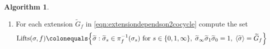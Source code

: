 \documentclass{dcthesis}
\newcommand{\ZZ}{\mathbb Z}
\newcommand{\wt}[1]{\widetilde{#1}}
\DeclareMathOperator{\Lifts}{Lifts}
\DeclareMathOperator{\order}{order}
\numberwithin{equation}{section}
\theoremstyle{definition}
\newtheorem{alg}[equation]{Algorithm}
\theoremstyle{remark}
\begin{document}
{{{\begin{alg}
\begin{enumerate}
\begin{equation}
          \end{equation}
        \item
          \label{alg:triplescomputelifts}
          For each extension
          $\wt{G}_f$ in
          \eqref{eqn:extensiondependson2cocycle}
          compute the set
          \begin{equation}
            \label{eqn:lifts}
            \Lifts(\sigma, f)
            \colonequals
            \Big\{
              \wt{\sigma}
              :
              \wt{\sigma}_s\in\pi_f^{-1}
              (\sigma_s)\text{ for }
              s\in\{0,1,\infty\},\;
              \wt{\sigma}_\infty
              \wt{\sigma}_1
              \wt{\sigma}_0=1,\;
              \langle\wt{\sigma}\rangle
              =\wt{G}_f
            \Big\}
          \end{equation}

\end{enumerate}
\end{alg}}}}
\end{document}
